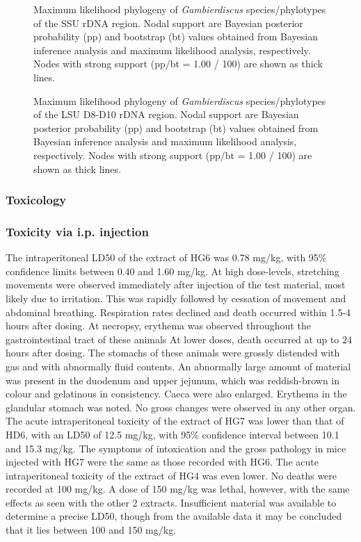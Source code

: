 \documentclass[12pt]{article}
\begin{document}
\begin{figure} 
\caption{Maximum likelihood phylogeny of \textit{Gambierdiscus} species/phylotypes of the SSU rDNA region. Nodal support are Bayesian posterior probability (pp) and bootstrap (bt) values obtained from Bayesian inference analysis and maximum likelihood analysis, respectively. Nodes with strong support (pp/bt = 1.00 / 100) are shown as thick lines.}
\label{fig:HGSSU} 
\end{figure} 
\FloatBarrier 

\begin{figure} 
\caption{Maximum likelihood phylogeny of \textit{Gambierdiscus} species/phylotypes of the LSU D8-D10 rDNA region. Nodal support are Bayesian posterior probability (pp) and bootstrap (bt) values obtained from Bayesian inference analysis and maximum likelihood analysis, respectively. Nodes with strong support (pp/bt = 1.00 / 100) are shown as thick lines.} 
\label{fig:HGD8D10}
\end{figure} 
\FloatBarrier 


\subsubsection{Toxicology}

\subsubsection{Toxicity via i.p. injection}
The intraperitoneal LD50 of the extract of HG6 was 0.78 mg/kg, with 95\% confidence limits between 0.40 and 1.60 mg/kg. At high dose-levels, stretching movements were observed immediately after injection of the test material, most likely due to irritation. This was rapidly followed by cessation of movement and abdominal breathing. Respiration rates declined and death occurred within 1.5-4 hours after dosing. At necropsy, erythema was observed throughout the gastrointestinal tract of these animals At lower doses, death occurred at up to 24 hours after dosing. The stomachs of these animals were grossly distended with gas and with abnormally fluid contents. An abnormally large amount of material was present in the duodenum and upper jejunum, which was reddish-brown in colour and gelatinous in consistency. Caeca were also enlarged. Erythema in the glandular stomach was noted. No gross changes were observed in any other organ. 
The acute intraperitoneal toxicity of the extract of HG7 was lower than that of HD6, with an LD50 of 12.5 mg/kg, with 95\% confidence interval between 10.1 and 15.3 mg/kg. The symptoms of intoxication and the gross pathology in mice injected with HG7 were the same as those recorded with HG6. 
The acute intraperitoneal toxicity of the extract of HG4 was even lower. No deaths were recorded at 100 mg/kg. A dose of 150 mg/kg was lethal, however, with the same effects as seen with the other 2 extracts. Insufficient material was available to determine a precise LD50, though from the available data it may be concluded that it lies between 100 and 150 mg/kg.
\end{document}
